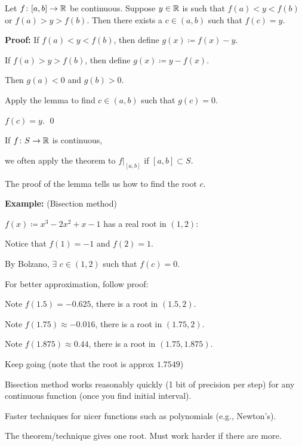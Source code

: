 \documentclass[10pt,aspectratio=149]{beamer}
\begin{document}
\begin{frame}

\begin{theorem}
Let $f \colon [a,b] \to {\mathbb{R}}$ be continuous.
Suppose $y \in {\mathbb{R}}$ is such that $f(a) < y < f(b)$
or $f(a) > y > f(b)$.
\pause
Then there exists a $c \in (a,b)$
such that $f(c) = y$.
\end{theorem}

\pause
\textbf{Proof:}
If $f(a) < y < f(b)$, then define $g(x) \coloneqq f(x)-y$.

\pause

If $f(a) > y > f(b)$, then define $g(x) \coloneqq y-f(x)$.

\pause
\medskip

Then $g(a) < 0$ and $g(b) > 0$.

\pause
Apply the lemma to find $c \in (a,b)$ such that $g(c) = 0$.

\pause
\thus \quad $f(c) = y$.
\qed

\pause
\medskip

If $f \colon S \to {\mathbb{R}}$ is continuous,

we often apply the theorem to $f|_{[a,b]}$ if $[a,b] \subset S$.

\end{frame}

\begin{frame}

The proof of the lemma tells us how to find the root $c$.

\pause
\medskip

\textbf{Example:} (Bisection method)

$f(x) \coloneqq x^3-2x^2+x-1$ has a real root in $(1,2)$:

\pause
Notice that $f(1) = -1$ and $f(2) = 1$.

\pause
By Bolzano, $\exists$ $c \in (1,2)$ such that $f(c) = 0$.

\pause
\medskip

For better approximation, follow proof:

Note $f(1.5) = -0.625$, \wthus
there is a root in $(1.5,2)$.

\pause
Note $f(1.75) \approx -0.016$, \wthus
there is a root in $(1.75,2)$.

\pause
Note $f(1.875) \approx 0.44$, \wthus
there is a root in $(1.75,1.875)$.

\pause
Keep going (note that the root is approx $1.7549$)

\pause
\medskip

Bisection method works reasonably quickly (1 bit of precision per step) for any
continuous function (once you find initial interval).

\pause
\medskip

Faster techniques for nicer functions such as polynomials (e.g., Newton's).

\pause
\medskip

The theorem/technique gives one root.  Must work harder if there are more.

\end{frame}
\end{document}
